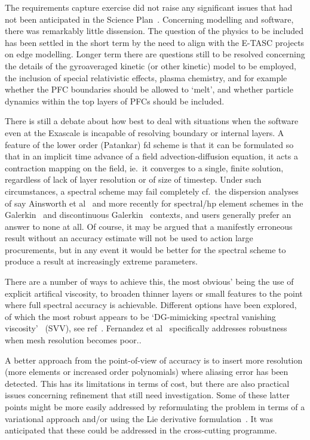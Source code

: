 The requirements capture exercise did not raise any significant issues that
had not been anticipated in the Science Plan~\cite{sciplan}.
Concerning modelling and software, there was remarkably little dissension.
The question of the physics to be included has been settled in the
short term  by the need to align with the E-TASC projects on edge modelling.
Longer term there are questions still to be resolved concerning the
details of the gyroaveraged kinetic (or other kinetic) model to be employed,
the inclusion of special relativistic effects, plasma chemistry, 
and for example whether the PFC boundaries should be allowed to `melt',
and whether particle dynamics within the top layers of PFCs should be included.

There is still a debate about how best to deal with situations when the software
even at the Exascale is incapable of resolving boundary or internal layers.
A feature of the lower order (Patankar) fd scheme is that it can be
formulated so that in an implicit time advance of a field advection-diffusion equation,
it acts a contraction mapping on the field, ie.\ it converges to a single, finite solution,
regardless of lack of layer resolution or of size of timestep. Under such circumstances, a spectral
scheme may fail completely cf.\ the dispersion analyses of say Ainsworth et al~\cite{Ai09Disp}
and more recently for spectral/hp element schemes in the Galerkin~\cite{Mo16Eige} and 
discontinuous Galerkin~\cite{Mo15line} contexts,
and users generally prefer an answer to none at all.
Of course, it may be argued that a manifestly erroneous result without an accuracy estimate
will not be used to action large procurements, but in any event it would be better
for the spectral scheme to produce a result at increasingly extreme parameters.

There are a number of ways to achieve this, the most obvious' being the use of
explicit artifical viscosity,
to broaden thinner layers or small features to the
point where full spectral accuracy is achievable.
Different options have been explored, of
which the most robust appears to be `DG-mimicking spectral vanishing viscosity'~ (SVV), see ref~\cite{Mo19Spat}.
Fernandez et al~\cite{Fe19Nonm} specifically addresses robustness when mesh resolution becomes poor..

A better approach from the point-of-view
of accuracy is to insert more resolution (more elements or increased order polynomials)
where aliasing error has been detected. This has its limitations in terms of cost,
but there are also practical issues concerning refinement that still need investigation.
Some of these latter points might be more easily addressed by reformulating the problem 
in terms of a variational approach and/or using the Lie derivative formulation~\cite{La03prac}.
It was anticipated that these could be addressed in the cross-cutting programme.

